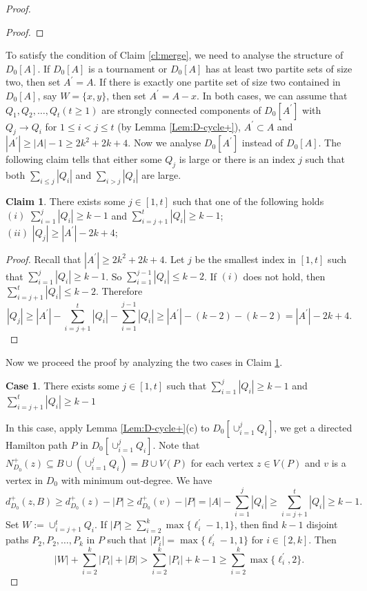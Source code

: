 \documentclass[10pt,a4paper]{article}
\theoremstyle{definition}
\newtheorem{claim}{Claim}
\newtheorem{case}{Case}
\begin{document}
\begin{proof}
\begin{proof}
\end{proof}
To satisfy the condition of Claim \ref{cl:merge}, we need to analyse the structure of $D_0[A]$. If $D_0[A]$ is a tournament or $D_0[A]$ has at least two partite sets of size two, then set $A^\prime=A$. If there is exactly one partite set of size two contained in $D_0[A]$,  say $W=\{x,y\}$, then set $A^{\prime}=A-x$.
In both cases, we can assume that $Q_1,Q_2,\ldots,Q_t (t\geq 1)$ are strongly connected components of $D_0[A^\prime]$ with  $Q_j\rightarrow Q_i$ for $1\leq i<j\leq t$ (by Lemma \ref{Lem:D-cycle+}), $A^\prime\subset A$ and $|A^\prime|\geq |A|-1\geq 2k^2+2k+4$. Now we analyse $D_0[A^\prime]$ instead of $D_0[A]$. The following claim tells that either some $Q_j$ is large or there is an index $j$ such that both $\sum_{i\leq j} |Q_i|$ and $\sum_{i>j} |Q_i|$ are large.


\begin{claim}\label{Cl:two-cases}
   There exists some $j\in[1,t]$ such that one of the following holds\\
   $(i)$ $\sum_{i=1}^j |Q_i|\geq k-1$ and $\sum_{i=j+1}^t |Q_i|\geq k-1$;\\
   $(ii)$ $|Q_j|\geq |A^\prime|-2k+4$;
\end{claim}
\begin{proof}
   Recall that $|A^\prime|\geq 2k^2+2k+4$. Let $j$ be the smallest index in $[1,t]$ such that $\sum_{i=1}^j |Q_i|\geq k-1$. So $\sum_{i=1}^{j-1} |Q_i|\leq k-2$. If $(i)$ does not hold, then  $\sum_{i=j+1}^t |Q_i|\leq k-2$. Therefore
   \[|Q_j|\geq |A^\prime|-\sum_{i=j+1}^t |Q_i|-\sum_{i=1}^{j-1} |Q_i|\geq |A^\prime|-(k-2)-(k-2)=|A^\prime|-2k+4.\]
\end{proof}
\setcounter{case}{0}
Now we proceed the proof by analyzing the two cases in  Claim \ref{Cl:two-cases}.
\begin{case}
   There exists some $j\in[1,t]$ such that $\sum_{i=1}^j |Q_i|\geq k-1$ and $\sum_{i=j+1}^t |Q_i|\geq k-1$
\end{case}
In this case, apply Lemma \ref{Lem:D-cycle+}(c) to $D_0[\cup_{i=1}^j Q_i]$, we get a directed Hamilton path $P$ in $D_0[\cup_{i=1}^j Q_i]$.  Note that $N^+_{D_0}(z)\subseteq B\cup\left(\cup_{i=1}^j Q_i\right)=B\cup V(P)$ for each vertex $z\in V(P)$ and $v$ is a vertex in $D_0$ with minimum out-degree. We have
$$d^+_{D_0}(z,B)\geq d^+_{D_0}(z)-|P|\geq d^+_{D_0}(v)-|P|=|A|-\sum_{i=1}^j |Q_i|\geq \sum_{i=j+1}^t |Q_i|\geq k-1.$$
Set $W:=\cup_{i=j+1}^t Q_i.$
If $|P|\geq \sum_{i=2}^k \max\{\ell^\prime_i-1,1\}$, then find $k-1$ disjoint paths $P_2,P_2,\ldots,P_k$ in $P$ such that $|P_i|= \max\{\ell^\prime_i-1,1\}$ for $i\in [2,k]$. Then
$$|W|+\sum_{i=2}^k|P_i|+|B|>\sum_{i=2}^k|P_i|+k-1\geq \sum_{i=2}^k \max\{\ell^\prime_i,2\}.$$



\end{proof}
\end{document}
